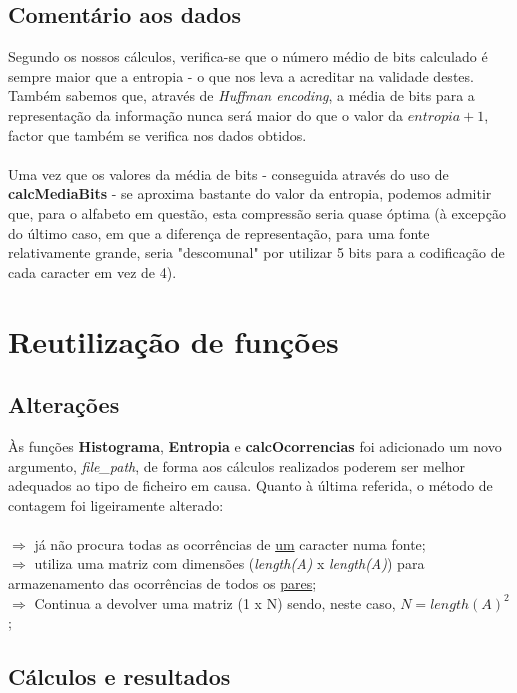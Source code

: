 \documentclass{article}
\begin{document}
\subsection{Comentário aos dados}

Segundo os nossos cálculos, verifica-se que o número médio de bits calculado é sempre maior que a entropia - o que nos leva a acreditar na validade destes. Também sabemos que, através de \textit{Huffman encoding}, a média de bits para a representação da informação nunca será maior do que o 
valor da $entropia + 1$, factor que também se verifica nos dados obtidos.\\\\
Uma vez que os valores da média de bits - conseguida através do uso de \textbf{calcMediaBits} - se aproxima bastante do valor da entropia, podemos admitir que, para o alfabeto em questão, esta compressão seria quase óptima (à excepção do último caso, em que a diferença de representação, para uma fonte relativamente grande, seria "descomunal" por utilizar 5 bits para a codificação de cada caracter em vez de 4).

\section{Reutilização de funções}

\subsection{Alterações}

Às funções \textbf{Histograma}, \textbf{Entropia} e \textbf{calcOcorrencias} foi adicionado um novo argumento, \textit{file\_path}, de forma aos cálculos realizados poderem ser melhor adequados ao tipo de ficheiro em causa. Quanto à última referida, o método de contagem foi ligeiramente alterado:\\\\
$\Rightarrow$ já não procura todas as ocorrências de \underline{um} caracter numa fonte;\\
$\Rightarrow$ utiliza uma matriz com dimensões (\textit{length(A)} x \textit{length(A)}) para armazenamento das ocorrências de todos os \underline{pares};\\
$\Rightarrow$ Continua a devolver uma matriz (1 x N) sendo, neste caso, $N = length(A)^2$;\\

\subsection{Cálculos e resultados}
\end{document}
